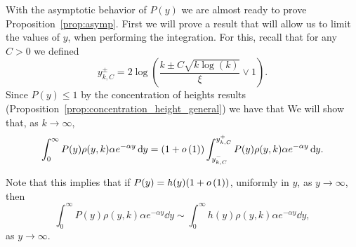 With the asymptotic behavior of $P(y)$ we are almost ready to prove Proposition~\ref{prop:asymp}. First we will prove a result that will allow us to limit the values of $y$, when performing the integration. For this, recall that for any $C > 0$ we defined
\[
	y_{k,C}^\pm = 2 \log\left(\frac{k \pm C \sqrt{k \log(k)}}{\xi} \vee 1\right).
\] 
Since $P(y) \le 1$ by the concentration of heights results (Proposition~\ref{prop:concentration_height_general}) we have that
We will show that, as $k \to \infty$,
\begin{equation}\label{eq:asymptotics_average_clustering_concentration}
	\int_0^\infty P(y) \rho(y,k) \alpha e^{-\alpha y} \operatorname{\mathrm{d}\hspace{-2pt}} y
	= (1+o\left(1\right)) \int_{y_{k,C}^-}^{y_{k,C}^+} P(y) \rho(y,k) \alpha e^{-\alpha y} \operatorname{\mathrm{d}\hspace{-2pt}} y.
\end{equation}

Note that this implies that if $P(y) = h(y)(1 + o\left(1\right))$, uniformly in $y$, as $y \to \infty$, then 
\begin{equation}\label{eq:asymptotics_average_clustering_error_term}
	\int_0^\infty P(y) \rho(y,k) \alpha e^{-\alpha y} \dd y
	\sim \int_0^\infty h(y) \rho(y,k) \alpha e^{-\alpha y} \dd y,
\end{equation}
as $y \to \infty$.

